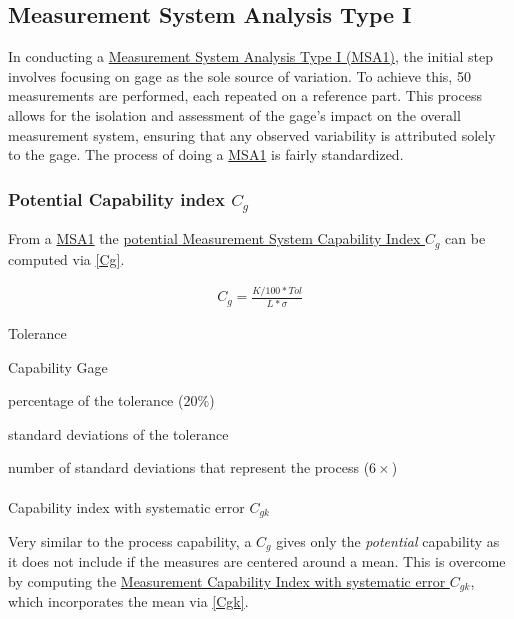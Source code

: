 \documentclass[
  a4paper,
]{scrbook}
\makeatletter
\let\oldparagraph\paragraph
\renewcommand{\paragraph}{
    \@ifstar
      \xxxParagraphStar
      \xxxParagraphNoStar
  }
\newcommand{\xxxParagraphStar}[1]{\oldparagraph*{#1}\mbox{}}
\newcommand{\xxxParagraphNoStar}[1]{\oldparagraph{#1}\mbox{}}
\providecommand{\tightlist}{%
  \setlength{\itemsep}{0pt}\setlength{\parskip}{0pt}}\usepackage{longtable,booktabs,array}
\let\olddescription\description
\let\endolddescription\enddescription
\renewenvironment{description}{
          \begin{spacing}{1.5}\olddescription
        }{
          \endolddescription\end{spacing}
        }
\makeatother
\begin{document}
\subsection{Measurement System Analysis Type
I}\label{measurement-system-analysis-type-i}

In conducting a \hyperref[MSA1]{Measurement System Analysis Type I
(MSA1)}, the initial step involves focusing on gage as the sole source
of variation. To achieve this, 50 measurements are performed, each
repeated on a reference part. This process allows for the isolation and
assessment of the gage's impact on the overall measurement system,
ensuring that any observed variability is attributed solely to the gage.
The process of doing a \hyperref[MSA1]{MSA1} is fairly standardized.

\subsubsection{\texorpdfstring{Potential Capability index
\(C_g\)}{Potential Capability index C\_g}}\label{potential-capability-index-c_g}

From a \hyperref[MSA1]{MSA1} the \hyperref[Cg]{potential Measurement
System Capability Index \(C_g\)} can be computed via \eqref{Cg}.

\begin{align}
C_g = \frac{K/100*Tol}{L*\sigma} \label{Cg}
\end{align}

\begin{description}
\tightlist
\item[\(Tol\)]
Tolerance
\item[\(C_g\)]
Capability Gage
\item[K]
percentage of the tolerance (\(20\%\))
\item[\(\sigma\)]
standard deviations of the tolerance
\item[L]
number of standard deviations that represent the process (\(6\times\))
\end{description}

\paragraph{\texorpdfstring{Capability index with systematic error
\(C_{gk}\)}{Capability index with systematic error C\_\{gk\}}}\label{capability-index-with-systematic-error-c_gk}

Very similar to the process capability, a \hyperref[Cg]{\(C_g\)} gives
only the \emph{potential} capability as it does not include if the
measures are centered around a mean. This is overcome by computing the
\hyperref[Cgk]{Measurement Capability Index with systematic error
\(C_{gk}\)}, which incorporates the mean via \eqref{Cgk}.
\end{document}
